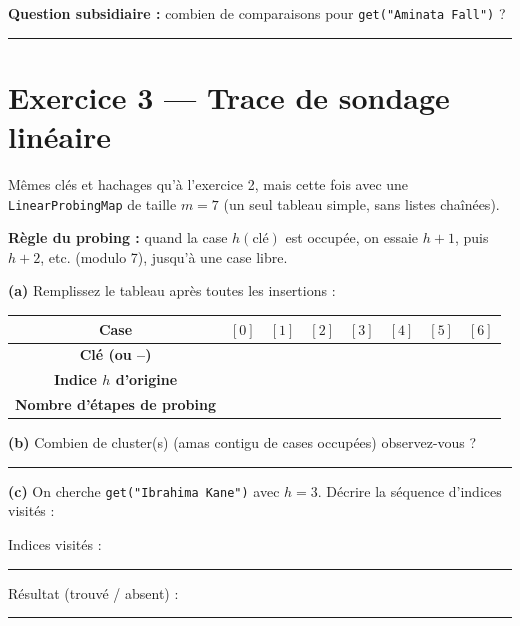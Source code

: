 \documentclass[11pt,a4paper]{article}
\begin{document}
\medskip

\textbf{Question subsidiaire :} combien de comparaisons pour \texttt{get("Aminata Fall")} ? \rule{3cm}{0.4pt}

\newpage
\section{Exercice 3 --- Trace de sondage linéaire}

Mêmes clés et hachages qu'à l'exercice 2, mais cette fois avec une \texttt{LinearProbingMap} de taille $m = 7$ (un seul tableau simple, sans listes chaînées).

\medskip

\textbf{Règle du probing :} quand la case $h(\text{clé})$ est occupée, on essaie $h+1$, puis $h+2$, etc. (modulo 7), jusqu'à une case libre.

\medskip

\textbf{(a)} Remplissez le tableau après toutes les insertions :

\begin{center}
\renewcommand{\arraystretch}{2.0}
\small
\begin{tabular}{|c|c|c|c|c|c|c|c|}
\hline
\textbf{Case} & $[0]$ & $[1]$ & $[2]$ & $[3]$ & $[4]$ & $[5]$ & $[6]$ \\
\hline
\textbf{Clé (ou --)} & & & & & & & \\
\hline
\textbf{Indice $h$ d'origine} & & & & & & & \\
\hline
\textbf{Nombre d'étapes de probing} & & & & & & & \\
\hline
\end{tabular}
\end{center}

\medskip

\textbf{(b)} Combien de cluster(s) (amas contigu de cases occupées) observez-vous ? \rule{8cm}{0.4pt}

\medskip

\textbf{(c)} On cherche \texttt{get("Ibrahima Kane")} avec $h = 3$. Décrire la séquence d'indices visités :

\medskip

Indices visités : \rule{12cm}{0.4pt}

\medskip

Résultat (trouvé / absent) : \rule{6cm}{0.4pt}

\end{document}
